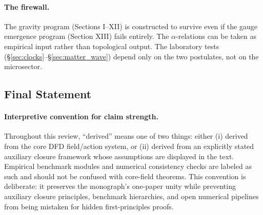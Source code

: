\paragraph{The firewall.}
The gravity program (Sections I--XII) is constructed to survive even if the gauge emergence program (Section XIII) fails entirely. The $\alpha$-relations can be taken as empirical input rather than topological output. The laboratory tests (\S\ref{sec:clocks}--\S\ref{sec:matter_wave}) depend only on the two postulates, not on the microsector.

\subsection{Final Statement}\label{sec:conclusions-final}

\paragraph{Interpretive convention for claim strength.}
Throughout this review, ``derived'' means one of two things: either (i) derived from the core DFD field/action system, or (ii) derived from an explicitly stated auxiliary closure framework whose assumptions are displayed in the text.  Empirical benchmark modules and numerical consistency checks are labeled as such and should not be confused with core-field theorems.  This convention is deliberate: it preserves the monograph's one-paper unity while preventing auxiliary closure principles, benchmark hierarchies, and open numerical pipelines from being mistaken for hidden first-principles proofs.

